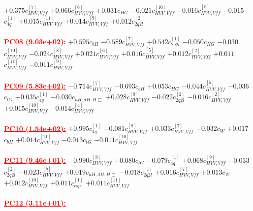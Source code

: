 \documentclass{article}
\begin{document}
{$+0.375$}{\rm $c_{HVV,Vff}^{[7]}$} 
{$+0.066$}{\rm $c_{HVV,Vff}^{[6]}$} 
{$+0.031$}{\rm $c_{HG}$} 
{$-0.021$}{\rm $c_{HVV,Vff}^{[10]}$} 
{$-0.016$}{\rm $c_{HVV,Vff}^{[5]}$} 
{$-0.015$}{\rm $c_{4q}^{[1]}$} 
{$+0.015$}{\rm $c_{HVV,Vff}^{[11]}$} 
{$+0.014$}{\rm $c_{HVV,Vff}^{[9]}$} 
{$+0.012$}{\rm $c_{2q2l}^{[2]}$} 
 \nonumber \\ \nonumber \\ 
\noindent \textcolor{red}{\underline{\bf{PC08} (9.03e+02):}}
{$+0.595$}{\rm $c_{bH}$} 
{$-0.589$}{\rm $c_{HVV,Vff}^{[7]}$} 
{$+0.542$}{\rm $c_{2q2l}^{[1]}$} 
{$-0.050$}{\rm $c_{HG}$} 
{$-0.030$}{\rm $c_{HVV,Vff}^{[10]}$} 
{$-0.024$}{\rm $c_{HVV,Vff}^{[8]}$} 
{$+0.021$}{\rm $c_{HVV,Vff}^{[6]}$} 
{$+0.016$}{\rm $c_{HVV,Vff}^{[5]}$} 
{$+0.012$}{\rm $c_{HVV,Vff}^{[2]}$} 
{$+0.011$}{\rm $c_{HVV,Vff}^{[11]}$} 
{$-0.011$}{\rm $c_{HVV,Vff}^{[9]}$} 
 \nonumber \\ \nonumber \\ 
\noindent \textcolor{red}{\underline{\bf{PC09} (5.83e+02):}}
{$-0.714$}{\rm $c_{HVV,Vff}^{[7]}$} 
{$-0.693$}{\rm $c_{bH}$} 
{$+0.053$}{\rm $c_{HG}$} 
{$-0.044$}{\rm $c_{HVV,Vff}^{[5]}$} 
{$-0.036$}{\rm $c_{tG}$} 
{$+0.035$}{\rm $c_{4q}^{[1]}$} 
{$-0.030$}{\rm $c_{uH,dH,H\Box}$} 
{$+0.028$}{\rm $c_{HVV,Vff}^{[9]}$} 
{$-0.022$}{\rm $c_{2q2l}^{[2]}$} 
{$-0.016$}{\rm $c_{HVV,Vff}^{[2]}$} 
{$+0.015$}{\rm $c_{HVV,Vff}^{[10]}$} 
{$-0.014$}{\rm $c_{HVV,Vff}^{[4]}$} 
 \nonumber \\ \nonumber \\ 
\noindent \textcolor{red}{\underline{\bf{PC10} (1.54e+02):}}
{$+0.995$}{\rm $c_{4q}^{[1]}$} 
{$-0.081$}{\rm $c_{HVV,Vff}^{[8]}$} 
{$+0.033$}{\rm $c_{HVV,Vff}^{[7]}$} 
{$-0.032$}{\rm $c_{W}$} 
{$+0.017$}{\rm $c_{bH}$} 
{$+0.014$}{\rm $c_{HVV,Vff}^{[11]}$} 
{$-0.013$}{\rm $c_{tG}$} 
{$-0.011$}{\rm $c_{HVV,Vff}^{[10]}$} 
 \nonumber \\ \nonumber \\ 
\noindent \textcolor{red}{\underline{\bf{PC11} (9.46e+01):}}
{$-0.990$}{\rm $c_{HVV,Vff}^{[8]}$} 
{$+0.080$}{\rm $c_{tG}$} 
{$-0.079$}{\rm $c_{4q}^{[1]}$} 
{$+0.068$}{\rm $c_{HVV,Vff}^{[9]}$} 
{$-0.033$}{\rm $c_{2q2l}^{[2]}$} 
{$-0.023$}{\rm $c_{HVV,Vff}^{[5]}$} 
{$+0.019$}{\rm $c_{uH,dH,H\Box}$} 
{$-0.018$}{\rm $c_{2q2l}^{[1]}$} 
{$+0.016$}{\rm $c_{HVV,Vff}^{[7]}$} 
{$+0.013$}{\rm $c_{W}$} 
{$+0.012$}{\rm $c_{HVV,Vff}^{[10]}$} 
{$+0.011$}{\rm $c_{top}^{[1]}$} 
{$+0.011$}{\rm $c_{HVV,Vff}^{[11]}$} 
 \nonumber \\ \nonumber \\ 
\noindent \textcolor{red}{\underline{\bf{PC12} (3.11e+01):}}
\end{document}
